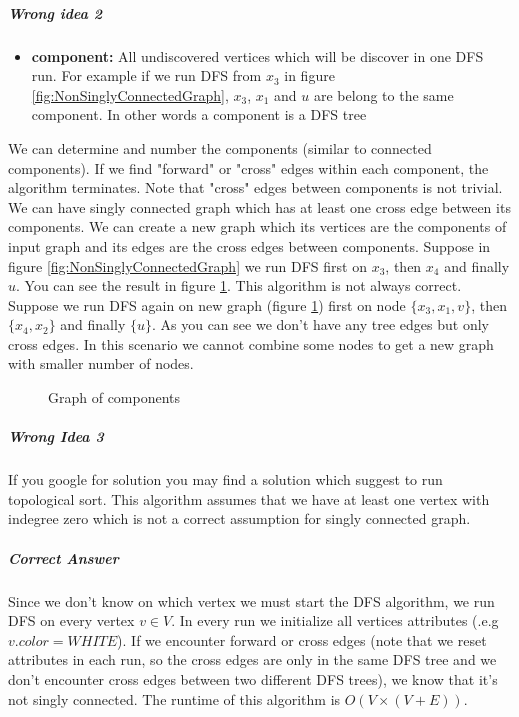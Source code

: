 \documentclass{book}
\begin{document}
	\subparagraph{Wrong idea 2}
	\begin{itemize}
		\item[] \textbf{component:} All undiscovered vertices which will be discover in one DFS run. For example if we run DFS from $x_3$ in figure \ref{fig:NonSinglyConnectedGraph}, $x_3$, $x_1$ and $u$ are belong to the same component. In other words a component is a DFS tree
	\end{itemize}
	We can determine and number the components (similar to connected components). If we find "forward" or "cross" edges within each component, the algorithm terminates. Note that "cross" edges between components is not trivial. We can have singly connected graph which has at least one cross edge between its components. We can create a new graph which its vertices are the components of input graph and its edges are the cross edges between components. Suppose in figure \ref{fig:NonSinglyConnectedGraph} we run DFS first on $x_3$, then $x_4$ and finally $u$. You can see the result in figure \ref{fig:GraphOfComponents}. This algorithm is not always correct. Suppose we run DFS again on new graph (figure \ref{fig:GraphOfComponents}) first on node $\{x_3, x_1, v\}$, then $\{x_4, x_2\}$ and finally $\{u\}$. As you can see we don't have any tree edges but only cross edges. In this scenario we cannot combine some nodes to get a new graph with smaller number of nodes.
	\begin{figure}[h!]
		\centering
		\caption{Graph of components}
		\label{fig:GraphOfComponents}
	\end{figure}
	\subparagraph{Wrong Idea 3}
	If you google for solution you may find a solution which suggest to run topological sort. This algorithm assumes that we have at least one vertex with indegree zero which is not a correct assumption for singly connected graph.
	\subparagraph{Correct Answer}
	Since we don't know on which vertex we must start the DFS algorithm, we run DFS on every vertex $v \in V$. In every run we initialize all vertices attributes (.e.g $v.color = WHITE$). If we encounter forward or cross edges (note that we reset attributes in each run, so the cross edges are only in the same DFS tree and we don't encounter cross edges between two different DFS trees), we know that it's not singly connected. The runtime of this algorithm is $O(V \times (V+E))$.
	
\end{document}
